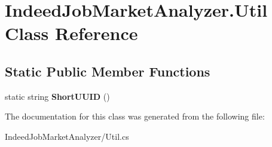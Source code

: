 \hypertarget{class_indeed_job_market_analyzer_1_1_util}{}\section{Indeed\+Job\+Market\+Analyzer.\+Util Class Reference}
\label{class_indeed_job_market_analyzer_1_1_util}
\subsection*{Static Public Member Functions}
\begin{DoxyCompactItemize}
\item 
\hypertarget{class_indeed_job_market_analyzer_1_1_util_ac2a79ff4d5b15abb9bc80c4a0c939ebd}{}static string {\bfseries Short\+U\+U\+I\+D} ()\label{class_indeed_job_market_analyzer_1_1_util_ac2a79ff4d5b15abb9bc80c4a0c939ebd}

\end{DoxyCompactItemize}


The documentation for this class was generated from the following file\+:\begin{DoxyCompactItemize}
\item 
Indeed\+Job\+Market\+Analyzer/Util.\+cs\end{DoxyCompactItemize}
